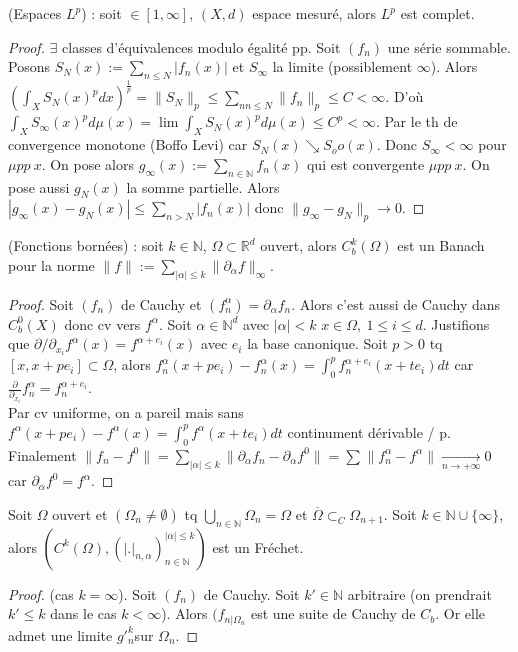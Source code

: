 \begin{ex}
    (Espaces $L^p$) : soit $\in [1,\infty ]$, $(X,d)$ espace mesuré, alors $L^p$ est complet.
\end{ex}
\begin{proof}
    $\exists $ classes d'équivalences modulo égalité pp. Soit $(f_n)$ une série sommable. Posons $S_N(x):=\sum\limits_{n\le N}^{} |f_n(x)|$ et $S_\infty $ la limite (possiblement $\infty $). Alors $\left( \int_XS_N(x)^pdx \right) ^{\frac{1}{p}}=\|S_N\|_p\le \sum\limits_{nn\le N}^{} \|f_n\|_p\le C<\infty$. D'où $\int_XS_\infty (x)^pd\mu(x)=\lim\limits_{} \int_XS_N(x)^pd\mu(x)\le C^p<\infty $. Par le th de convergence monotone (Boffo Levi) car $S_N(x)\searrow S_oo(x)$. Donc $S_\infty <\infty $ pour $\mu pp\ x$. On pose alors $g_\infty (x):=\sum\limits_{n\in \mathbb{N} }^{} f_n(x)$ qui est convergente $\mu pp\ x$. On pose aussi $g_N(x)$ la somme partielle. Alors $|g_\infty(x) -g_N(x)|\le \sum\limits_{n>N}^{} |f_n(x)|$ donc $\|g_\infty -g_N\|_p\to 0$.
\end{proof}

\begin{ex}
    (Fonctions bornées) : soit $k\in \mathbb{N} $, $\Omega\subset \mathbb{R} ^d$ ouvert, alors $C^k_b(\Omega)$ est un Banach pour la norme $\|f\|:=\sum\limits_{|\alpha |\le k}^{} \|\partial_{\alpha }f\|_\infty $.
\end{ex}
\begin{proof}
    Soit $(f_n)$ de Cauchy et $(f_n^\alpha)=\partial_\alpha f_n$. Alors c'est aussi de Cauchy dans $C^0_b(X)$ donc cv vers $f^\alpha $. Soit $\alpha \in \mathbb{N} ^d$ avec $|\alpha |< k$ $x\in \Omega,\ 1\le i\le d$. Justifions que $\partial/\partial_{x_i}f^\alpha (x)=f^{\alpha+e_i}(x) $ avec $e_i$ la base canonique. Soit $p>0$ tq $[x,x+pe_i]\subset \Omega$, alors $f^\alpha _n(x+pe_i)-f^\alpha _n(x)=\int_0^pf_n^{\alpha +e_i}(x+te_i)dt$ car $\frac{\partial}{\partial_{x_i}}f_n^\alpha =f_n^{\alpha +e_i}$.\\
    Par cv uniforme, on a pareil mais sans $f^\alpha(x+pe_i)-f^\alpha(x)=\int_0^pf^{\alpha}(x+te_i)dt$ continument dérivable / p.\\
    Finalement $\|f_n-f^0\|=\sum\limits_{|\alpha |\le k}^{} \|\partial_\alpha f_n-\partial_\alpha f^0\|=\sum\limits_{}^{} \|f_n^\alpha -f^\alpha \| \xrightarrow[n\to +\infty]{} 0$ car $\partial _\alpha f^0=f^\alpha $.
\end{proof}

\begin{ex}
    Soit $\Omega$ ouvert et $(\Omega_n\neq \emptyset )$ tq $\bigcup\limits_{n\in \mathbb{N} } \Omega_n=\Omega$ et $\overline{\Omega}\subset _C\Omega_{n+1}$. Soit $k\in \mathbb{N} \cup \{\infty \} $, alors $\left( C^k(\Omega),(|.|_{n,\alpha })_{n\in \mathbb{N} }^{|\alpha |\le k} \right) $ est un Fréchet.
\end{ex}
\begin{proof}
    (cas $k=\infty $). Soit $(f_n)$ de Cauchy. Soit $k'\in \mathbb{N} $ arbitraire (on prendrait $k'\le k$ dans le cas $k<\infty $). Alors $(f_{n|\Omega_n}$ est une suite de Cauchy de $C_b$. Or elle admet une limite $g'^k_n$sur $\Omega_n$.
\end{proof}


